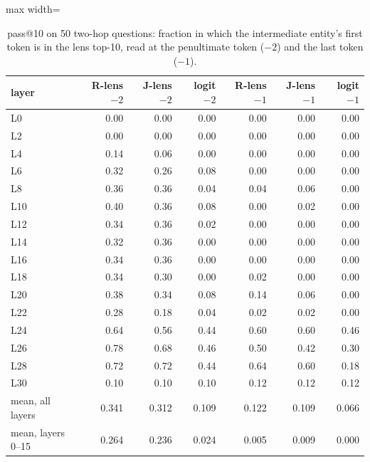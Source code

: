 \begin{table}[t]
\centering
\footnotesize
\caption{pass@10 on 50 two-hop questions: fraction in which the intermediate entity's first token is in the lens top-10, read at the penultimate token ($-2$) and the last token ($-1$).}
\label{tab:rlens_pass10}
\begin{adjustbox}{max width=\textwidth}
\begin{tabular}{lrrrrrr}
\toprule
layer & R-lens $-2$ & J-lens $-2$ & logit $-2$ & R-lens $-1$ & J-lens $-1$ & logit $-1$ \\
\midrule
L0 & 0.00 & 0.00 & 0.00 & 0.00 & 0.00 & 0.00 \\
L2 & 0.00 & 0.00 & 0.00 & 0.00 & 0.00 & 0.00 \\
L4 & 0.14 & 0.06 & 0.00 & 0.00 & 0.00 & 0.00 \\
L6 & 0.32 & 0.26 & 0.08 & 0.00 & 0.00 & 0.00 \\
L8 & 0.36 & 0.36 & 0.04 & 0.04 & 0.06 & 0.00 \\
L10 & 0.40 & 0.36 & 0.08 & 0.00 & 0.02 & 0.00 \\
L12 & 0.34 & 0.36 & 0.02 & 0.00 & 0.00 & 0.00 \\
L14 & 0.32 & 0.36 & 0.00 & 0.00 & 0.00 & 0.00 \\
L16 & 0.34 & 0.36 & 0.00 & 0.00 & 0.00 & 0.00 \\
L18 & 0.34 & 0.30 & 0.00 & 0.02 & 0.00 & 0.00 \\
L20 & 0.38 & 0.34 & 0.08 & 0.14 & 0.06 & 0.00 \\
L22 & 0.28 & 0.18 & 0.04 & 0.02 & 0.02 & 0.00 \\
L24 & 0.64 & 0.56 & 0.44 & 0.60 & 0.60 & 0.46 \\
L26 & 0.78 & 0.68 & 0.46 & 0.50 & 0.42 & 0.30 \\
L28 & 0.72 & 0.72 & 0.44 & 0.64 & 0.60 & 0.18 \\
L30 & 0.10 & 0.10 & 0.10 & 0.12 & 0.12 & 0.12 \\
\midrule
mean, all layers & 0.341 & 0.312 & 0.109 & 0.122 & 0.109 & 0.066 \\
mean, layers 0--15 & 0.264 & 0.236 & 0.024 & 0.005 & 0.009 & 0.000 \\
\bottomrule
\end{tabular}
\end{adjustbox}
\end{table}